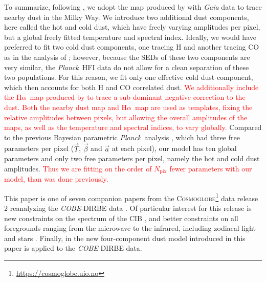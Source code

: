 \documentclass{aa}
\makeatletter
\DeclareRobustCommand{\ion}[2]{%
\relax\ifmmode
\ifx\testbx\f@series
{\mathbf{#1\,\mathsc{#2}}}\else
{\mathrm{#1\,\mathsc{#2}}}\fi
\else\textup{#1\,{\mdseries\textsc{#2}}}%
\fi}
\newcommand{\mathsc}[1]{{\normalfont\textsc{#1}}}
\def\cosmoglobe{\textsc{Cosmoglobe}}
\def\Planck{\textit{Planck}}
\def\planck{\textit{Planck}}
\def\COBE{\textit{COBE}}
\def\Ha{H$\alpha$}
\def\,{\thinspace}
\newcommand{\edit}[1]{\textcolor{red}{#1}}
\makeatother
\begin{document}
To summarize, following \cite{CG02_05}, we adopt the map produced by \citet{edenhofer:2024} with \textit{Gaia} data \citep{gaia:2016} to trace nearby dust in the Milky Way.
We introduce two additional dust components, here called the hot and cold dust, which have freely varying amplitudes per pixel, but a global freely fitted temperature and spectral index. Ideally, we would have preferred to fit two cold dust components, one tracing \ion{H}{i} and another tracing CO as in the analysis of \citet{CG02_05}; however, because the SEDs of these two components are very similar, the \Planck\ HFI data do not allow for a clean separation of these two populations. For this reason, we fit only one effective cold dust component, which then accounts for both \ion{H}{i} and CO correlated dust. \edit{We additionally include the \Ha\ map produced by \citet{wham:2003,2016WHAM} to trace a sub-dominant negative correction to the dust. Both the nearby dust map and \Ha\ map are used as templates, fixing the relative amplitudes between pixels, but allowing the overall amplitudes of the maps, as well as the temperature and spectral indices, to vary globally.}
Compared to the previous Bayesian parametric \planck\ analysis \citep{planck2014-a12}, which had three free parameters per pixel ($\vec{T}$, $\vec{\beta}$ and $\vec{a}$ at each pixel), our model has ten global parameters and only two free parameters per pixel, namely the hot and cold dust amplitudes. \edit{Thus we are fitting on the order of $N_\mathrm{pix}$ fewer parameters with our model, than was done previously.}

This paper is one of seven companion papers from the \cosmoglobe\footnote{\url{https://cosmoglobe.uio.no}} data release 2 \citep[DR2;][]{CG02_01} reanalyzing the \COBE-DIRBE data \citep{hauser1998}. Of particular interest for this release is new constraints on the spectrum of the CIB \citep{CG02_03}, and better constraints on all foregrounds ranging from the microwave to the infrared, including zodiacal light \citep{CG02_02} and stars \citep{CG02_04}. Finally, in \cite{CG02_07} the new four-component dust model introduced in this paper is applied to the \COBE-DIRBE data. 

\end{document}

